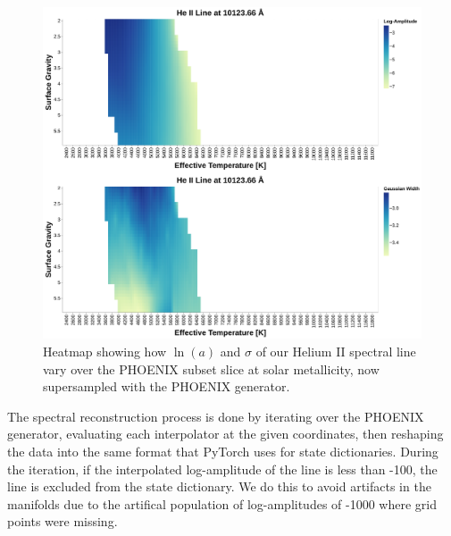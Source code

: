 \documentclass[twocolumn, linenumbers]{aastex631}
\begin{document}
\begin{figure}
    \centering
    \includegraphics[width=\textwidth]{figure6}
    \caption{Heatmap showing how $\ln(a)$ and $\sigma$ of our Helium II spectral line vary over the PHOENIX subset slice at solar metallicity, now supersampled with the PHOENIX generator.}
    \label{fig:figure6}
\end{figure}

The spectral reconstruction process is done by iterating over the PHOENIX generator, evaluating each interpolator at the given coordinates, then reshaping the data into the same format that PyTorch uses for state dictionaries.
During the iteration, if the interpolated log-amplitude of the line is less than -100, the line is excluded from the state dictionary.
We do this to avoid artifacts in the manifolds due to the artifical population of log-amplitudes of -1000 where grid points were missing.
\end{document}
